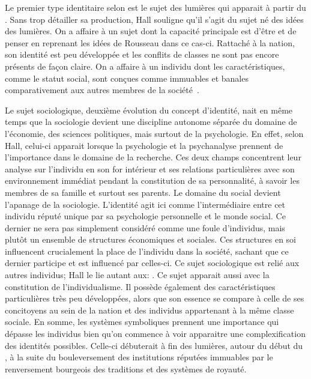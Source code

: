 Le premier type identitaire selon \citeauthor{Hall1996a} est le sujet des lumières qui apparait à partir du .
Sans trop détailler sa production, Hall souligne qu'il s'agit du sujet né des idées des lumières.
On a affaire à un sujet dont la capacité principale est d'être et de penser en reprenant les idées de Rousseau dans ce cas-ci.
Rattaché à la nation, son identité est peu développée et les conflits de classes ne sont pas encore présents de façon claire.
On a affaire à un individu dont les caractéristiques, comme le statut social, sont conçues comme immuables et banales comparativement aux autres membres de la société~\citeyearpar[596]{Hall1996a}.

Le sujet sociologique, deuxième évolution du concept d'identité, nait en même temps que la sociologie devient une discipline autonome séparée du domaine de l'économie, des sciences politiques, mais surtout de la psychologie.
En effet, selon Hall, celui-ci apparait lorsque la psychologie et la psychanalyse prennent de l'importance dans le domaine de la recherche.
Ces deux champs concentrent leur analyse sur l'individu en son for intérieur et ses relations particulières avec son environnement immédiat pendant la constitution de sa personnalité, à savoir les membres de sa famille et surtout ses parents.
Le domaine du social devient l'apanage de la sociologie.
L'identité agit ici comme l'intermédiaire entre cet individu réputé unique par sa psychologie personnelle et le monde social.
Ce dernier ne sera pas simplement considéré comme une foule d'individus, mais plutôt un ensemble de structures économiques et sociales.
Ces structures en soi influencent crucialement la place de l'individu dans la société, sachant que ce dernier participe et est influencé par celles-ci.
Ce sujet sociologique est relié aux autres individus; Hall le lie autant aux: .
Ce sujet apparait aussi avec la constitution de l'individualisme.
Il possède également des caractéristiques particulières très peu développées, alors que son essence se compare à celle de ses concitoyens au sein de la nation et des individus appartenant à la même classe sociale.
En somme, les systèmes symboliques prennent une importance qui dépasse les individus bien qu'on commence à voir apparaitre une complexification des identités possibles.
Celle-ci débuterait à fin des lumières, autour du début du , à la suite du bouleversement des institutions réputées immuables par le renversement bourgeois des traditions et des systèmes de royauté. 

